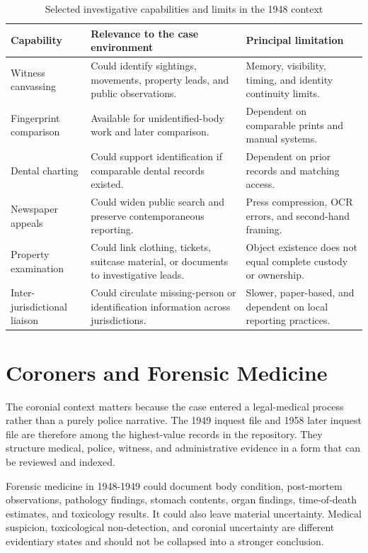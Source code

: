 \begin{table}[htbp]
\centering
\caption{Selected investigative capabilities and limits in the 1948 context}
\label{tab:context-policing-capabilities}
\begin{tabularx}{\textwidth}{p{}X p{}}
\toprule
Capability & Relevance to the case environment & Principal limitation \\
\midrule
Witness canvassing & Could identify sightings, movements, property leads, and public observations. & Memory, visibility, timing, and identity continuity limits. \\
Fingerprint comparison & Available for unidentified-body work and later comparison. & Dependent on comparable prints and manual systems. \\
Dental charting & Could support identification if comparable dental records existed. & Dependent on prior records and matching access. \\
Newspaper appeals & Could widen public search and preserve contemporaneous reporting. & Press compression, OCR errors, and second-hand framing. \\
Property examination & Could link clothing, tickets, suitcase material, or documents to investigative leads. & Object existence does not equal complete custody or ownership. \\
Inter-jurisdictional liaison & Could circulate missing-person or identification information across jurisdictions. & Slower, paper-based, and dependent on local reporting practices. \\
\bottomrule
\end{tabularx}
\end{table}

\section{Coroners and Forensic Medicine}

The coronial context matters because the case entered a legal-medical process rather than a purely police narrative. The 1949 inquest file and 1958 later inquest file are therefore among the highest-value records in the repository. They structure medical, police, witness, and administrative evidence in a form that can be reviewed and indexed.

Forensic medicine in 1948-1949 could document body condition, post-mortem observations, pathology findings, stomach contents, organ findings, time-of-death estimates, and toxicology results. It could also leave material uncertainty. Medical suspicion, toxicological non-detection, and coronial uncertainty are different evidentiary states and should not be collapsed into a stronger conclusion.

